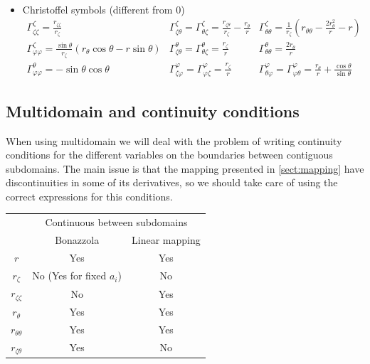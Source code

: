 \begin{itemize}
\begin{itemize}
\begin{equation}
\begin{array}{l}
\end{array}
\end{equation}
\end{itemize}
\item Christoffel symbols (different from 0)
\begin{equation}
\begin{array}{lll}
\displaystyle
\Gamma^{\zeta}_{\zeta\zeta}=\frac{r_{\zeta\zeta}}{r_\zeta}&
\displaystyle
\Gamma^{\zeta}_{\zeta\theta}=\Gamma^{\zeta}_{\theta\zeta}=
\frac{r_{\zeta\theta}}{r_\zeta}-\frac{r_\theta}{r}&
\displaystyle
\Gamma^{\zeta}_{\theta\theta}=\frac{1}{r_\zeta}\left(r_{\theta\theta}-
\frac{2r_\theta^2}{r}-r\right)\\
\displaystyle
\Gamma^{\zeta}_{\varphi\varphi}=\frac{\sin\theta}{r_\zeta}(r_\theta\cos\theta
-r\sin\theta)&
\displaystyle
\Gamma^{\theta}_{\zeta\theta}=\Gamma^{\theta}_{\theta\zeta}=\frac{r_\zeta}{r}&
\displaystyle
\Gamma^{\theta}_{\theta\theta}=\frac{2r_{\theta}}{r}\\
\displaystyle
\Gamma^{\theta}_{\varphi\varphi}=-\sin\theta\cos\theta&
\displaystyle
\Gamma^{\varphi}_{\zeta\varphi}=\Gamma^{\varphi}_{\varphi\zeta}=\frac{r_\zeta}{r}&
\displaystyle
\Gamma^{\varphi}_{\theta\varphi}=\Gamma^{\varphi}_{\varphi\theta}=\frac{r_\theta}{r}+
\frac{\cos\theta}{\sin\theta}
\end{array}
\end{equation}

\end{itemize}

\subsection{Multidomain and continuity conditions}

When using multidomain we will deal with the problem of writing continuity conditions for the different variables
on the boundaries between contiguous subdomains. The main issue is that the mapping presented in \ref{sect:mapping}
have discontinuities in some of its derivatives, so we should take care of using the correct expressions for
this conditions. 

\begin{center}
\begin{tabular}{c|c|c}
& \multicolumn{2}{c}{Continuous between subdomains} \\
& Bonazzola & Linear mapping \\
\hline
$r$ & Yes & Yes\\
$r_\zeta$ & No (Yes for fixed $a_i$) & No\\
$r_{\zeta\zeta}$ & No & Yes \\
$r_\theta$ & Yes & Yes \\
$r_{\theta\theta}$ & Yes & Yes \\
$r_{\zeta\theta}$ & Yes & No \\
\end{tabular}
\end{center}

